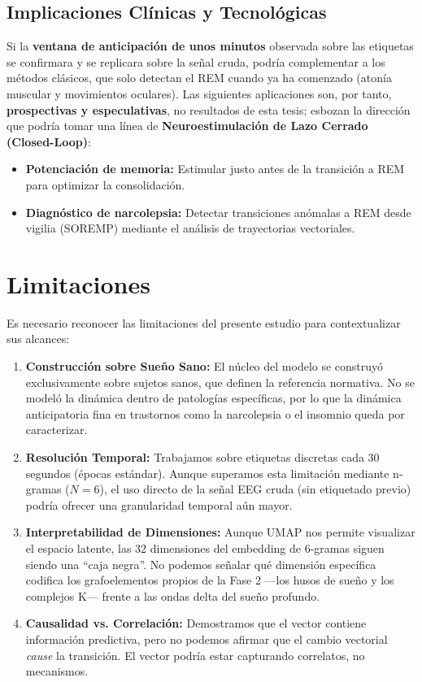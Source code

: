 \subsection{Implicaciones Clínicas y Tecnológicas}

Si la \textbf{ventana de anticipación de unos minutos} observada sobre las etiquetas se confirmara y se replicara sobre la señal cruda, podría complementar a los métodos clásicos, que solo detectan el REM cuando ya ha comenzado (atonía muscular y movimientos oculares). Las siguientes aplicaciones son, por tanto, \textbf{prospectivas y especulativas}, no resultados de esta tesis; esbozan la dirección que podría tomar una línea de \textbf{Neuroestimulación de Lazo Cerrado (Closed-Loop)}:

\begin{itemize}
    \item \textbf{Potenciación de memoria:} Estimular justo antes de la transición a REM para optimizar la consolidación.
    \item \textbf{Diagnóstico de narcolepsia:} Detectar transiciones anómalas a REM desde vigilia (SOREMP) mediante el análisis de trayectorias vectoriales.
\end{itemize}

\section{Limitaciones}

Es necesario reconocer las limitaciones del presente estudio para contextualizar sus alcances:

\begin{enumerate}
    \item \textbf{Construcción sobre Sueño Sano:} El núcleo del modelo se construyó exclusivamente sobre sujetos sanos, que definen la referencia normativa. No se modeló la dinámica dentro de patologías específicas, por lo que la dinámica anticipatoria fina en trastornos como la narcolepsia o el insomnio queda por caracterizar.
    
    \item \textbf{Resolución Temporal:} Trabajamos sobre etiquetas discretas cada 30 segundos (épocas estándar). Aunque superamos esta limitación mediante n-gramas ($N=6$), el uso directo de la señal EEG cruda (sin etiquetado previo) podría ofrecer una granularidad temporal aún mayor.
    
    \item \textbf{Interpretabilidad de Dimensiones:} Aunque UMAP nos permite visualizar el espacio latente, las 32 dimensiones del embedding de 6-gramas siguen siendo una ``caja negra''. No podemos señalar qué dimensión específica codifica los grafoelementos propios de la Fase 2 ---los husos de sueño y los complejos K--- frente a las ondas delta del sueño profundo.
    
    \item \textbf{Causalidad vs. Correlación:} Demostramos que el vector contiene información predictiva, pero no podemos afirmar que el cambio vectorial \textit{cause} la transición. El vector podría estar capturando correlatos, no mecanismos.
\end{enumerate}

